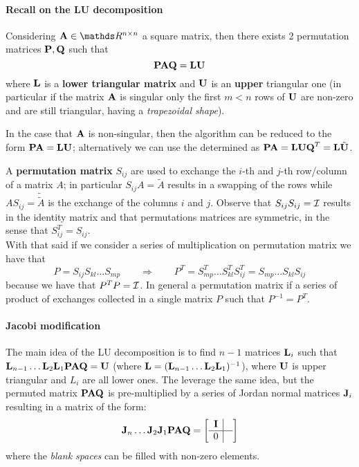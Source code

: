 		\paragraph{Recall on the LU decomposition} Considering $ \mat A \in \mathds R^{n\times n}$ a square matrix, then there exists 2 permutation matrices $\mathbf{P},\mathbf{Q}$ such that
		\begin{equation}
			\mathbf{PA Q} = \mathbf{LU}
		\end{equation}	
		where $\mathbf{L}$ is a \textbf{lower triangular matrix} and $\mathbf{U}$ is an \textbf{upper} triangular one (in particular if the matrix $\mathbf{A}$ is singular only the first $m<n$ rows of $\mathbf{U}$ are non-zero and are still triangular, having a \textit{trapezoidal shape}).
		
		In the case that $\mathbf{A}$ is non-singular, then the algorithm can be reduced to the form $\mathbf{PA} = \mathbf{LU}$; alternatively we can use the  determined as $\mathbf{PA} = \mathbf{LUQ}^T = \mathbf{L}\tilde{\mathbf{U}}$. \vspace{3mm}
		
		A \textbf{permutation matrix} $S_{ij}$ are used to exchange the $i$-th and $j$-th row/column of a matrix $A$; in particular $S_{ij} A = \tilde A$ results in a swapping of the rows while $A S_{ij} = \tilde{\tilde A}$ is the exchange of the columns $i$ and $j$. Observe that $S_{ij} S_{ij} = \mathcal I$ results in the identity matrix and that permutations matrices are symmetric, in the sense that $S_{ij}^T = S_{ij}$.\\
	
		With that said if we consider a series of multiplication on permutation matrix we have that
		\[ P = S_{ij} S_{kl} \dots S_{mp} \qquad \Rightarrow \qquad P^T = S_{mp}^T \dots S_{kl}^T S_{ij}^T = S_{mp} \dots S_{kl} S_{ij} \]
		because we have that $P^TP=\mathcal I$. In general a permutation matrix if a series of product of exchanges collected in a single matrix $P$ such that $P^{-1} = P^T$.
		
		\paragraph{Jacobi modification} The main idea of the LU decomposition is to find $n-1$ matrices $\mathbf{L}_i$ such that $\mathbf{L}_{n-1} \dots\mathbf{L}_2 \mathbf{L}_1 \mathbf{PAQ} = \mathbf{U}$ (where $\mathbf{L} = ( \mathbf{L}_{n-1}\dots \mathbf{L}_2\mathbf{L}_1)^{-1}$), where $\mathbf{U}$ is upper triangular and $L_i$ are all lower ones. The  leverage the same idea, but the permuted matrix $\mathbf{PAQ}$ is pre-multiplied by a series of Jordan normal matrices $\mathbf{J}_i$ resulting in a matrix of the form:
		\[ \mathbf{J}_n\dots \mathbf{J}_2\mathbf{J}_1 \mathbf{PAQ} = \begin{bmatrix} \begin{array}{c|c}
			\mathbf{I} & \\ \hline 0 & 
		\end{array} \end{bmatrix} \]
		where the \textit{blank spaces} can be filled with non-zero elements.

